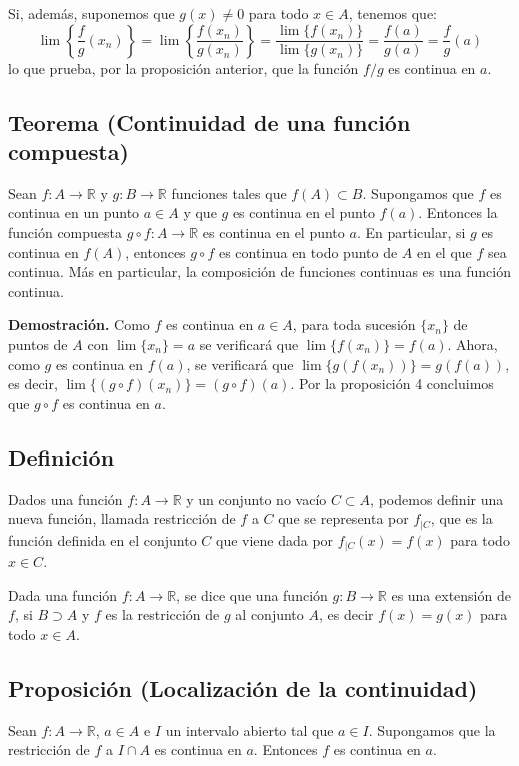 \documentclass[10pt,a4paper]{article}
\begin{document}
	Si, además, suponemos que $g(x) \neq 0$ para todo $x \in A$, tenemos que:
	$$\lim\left\{\dfrac{f}{g} (x_n)\right\} = \lim \left\{\dfrac{f(x_n)}{g(x_n)}\right\} = \dfrac{\lim\{f(x_n)\}}{\lim\{g(x_n)\}} = \dfrac{f(a)}{g(a)} = \dfrac{f}{g}(a)$$
	lo que prueba, por la proposición anterior, que la función $f/g$ es continua en $a$.
	
	\subsection{Teorema (Continuidad de una función compuesta)}
	Sean $f : A \rightarrow \mathbb{R}$ y $g : B \rightarrow \mathbb{R}$ funciones tales que $f(A) \subset B$. Supongamos que $f$ es continua en un punto $a \in A$ y que $g$ es continua en el punto $f(a)$. Entonces la función compuesta $g \circ f : A \rightarrow \mathbb{R}$ es continua en el punto $a$. En particular, si $g$ es continua en $f(A)$, entonces $g \circ f$ es continua en todo punto de $A$ en el que $f$ sea continua. Más en particular, la composición de funciones continuas es una función continua.
	
	\textbf{Demostración. }Como $f$ es continua en $a \in A$, para toda sucesión $\{x_n\}$ de puntos de $A$ con $\lim\{x_n\} = a$ se verificará que $\lim\{f(x_n)\} = f(a)$. Ahora, como $g$ es continua en $f(a)$, se verificará que $\lim\{g(f(x_n))\} = g(f(a))$, es decir, $\lim\{(g \circ f)(x_n)\} = (g \circ f) (a)$. Por la proposición 4 concluimos que $g \circ f$ es continua en $a$.
	
	\subsection{Definición}
	Dados una función $f : A \rightarrow \mathbb{R}$ y un conjunto no vacío $C \subset A$, podemos definir una nueva función, llamada restricción de $f$ a $C$ que se representa por $f_{|C}$, que es la función definida en el conjunto $C$ que viene dada por $f_{|C}(x) = f(x)$ para todo $x \in C$.
	
	Dada una función $f: A \rightarrow \mathbb{R}$, se dice que una función $g: B \rightarrow \mathbb{R}$ es una extensión de $f$, si $B \supset A$ y $f$ es la restricción de $g$ al conjunto $A$, es decir $f(x) = g(x)$ para todo $x \in A$.
	
	\subsection{Proposición (Localización de la continuidad)}
	Sean $f: A \rightarrow \mathbb{R}$, $a \in A$ e $I$ un intervalo abierto tal que $a \in I$. Supongamos que la restricción de $f$ a $I \cap A$ es continua en $a$. Entonces $f$ es continua en $a$.
	
\end{document}
